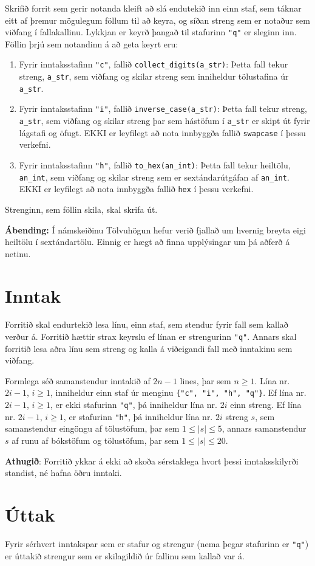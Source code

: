 
Skrifið forrit sem gerir notanda kleift að slá endutekið inn einn staf, sem táknar eitt af þremur mögulegum föllum til að keyra, og síðan streng sem er notaður sem viðfang í fallakallinu.
Lykkjan er keyrð þangað til stafurinn \texttt{"q"} er sleginn inn. \\

Föllin þrjú sem notandinn á að geta keyrt eru: 
\begin{enumerate} 
    \item Fyrir inntaksstafinn \texttt{"c"}, fallið \texttt{collect\_digits(a\_str)}: Þetta fall tekur streng, \texttt{a\_str}, sem viðfang og skilar streng sem inniheldur tölustafina úr \texttt{a\_str}.
    \item Fyrir inntaksstafinn \texttt{"i"}, fallið \texttt{inverse\_case(a\_str)}: Þetta fall tekur streng, \texttt{a\_str}, sem viðfang og skilar streng þar sem hástöfum í \texttt{a\_str} er skipt út fyrir lágstafi og öfugt. EKKI er leyfilegt að nota innbyggða fallið \texttt{swapcase} í þessu verkefni.
    \item Fyrir inntaksstafinn \texttt{"h"}, fallið \texttt{to\_hex(an\_int)}: Þetta fall tekur heiltölu, \texttt{an\_int}, sem viðfang og skilar streng sem er sextándarútgáfan af \texttt{an\_int}. EKKI er leyfilegt að nota innbyggða fallið \texttt{hex} í þessu verkefni.
\end{enumerate}

Strenginn, sem föllin skila, skal skrifa út.

\noindent
\textbf{Ábending:} Í námskeiðinu Tölvuhögun hefur verið fjallað um hvernig breyta eigi heiltölu í sextándartölu.
Einnig er hægt að finna upplýsingar um þá aðferð á netinu. 

\section*{Inntak}
Forritið skal endurtekið lesa línu, einn staf, sem stendur fyrir fall sem kallað verður á.
Forritið hættir strax keyrslu ef línan er strengurinn \texttt{"q"}.
Annars skal forritið lesa aðra línu sem streng og kalla á viðeigandi fall með inntakinu sem viðfang.

Formlega séð samanstendur inntakið af $2n-1$ lines, þar sem $n \ge 1$. 
Lína nr. $2i-1$, $i \ge 1$, inniheldur einn staf úr menginu \texttt{\{"c", "i", "h", "q"\}}. 
Ef lína nr. $2i-1$, $i \ge 1$, er ekki stafurinn \texttt{"q"}, þá inniheldur lína nr. $2i$ einn streng. 
Ef lína nr. $2i-1$, $i \ge 1$, er stafurinn \texttt{"h"}, þá inniheldur lína nr. $2i$ streng $s$, sem samanstendur eingöngu af tölustöfum, þar sem $1 \le |s| \le 5$, annars samanstendur $s$ af runu af bókstöfum og tölustöfum, þar sem $1 \le |s| \le 20$. 

\textbf{Athugið}: Forritið ykkar á ekki að skoða sérstaklega hvort þessi inntaksskilyrði standist, né hafna öðru inntaki.

\section*{Úttak}
Fyrir sérhvert inntakspar sem er stafur og strengur (nema þegar stafurinn er \texttt{"q"}) er úttakið strengur sem er skilagildið úr fallinu sem kallað var á.
